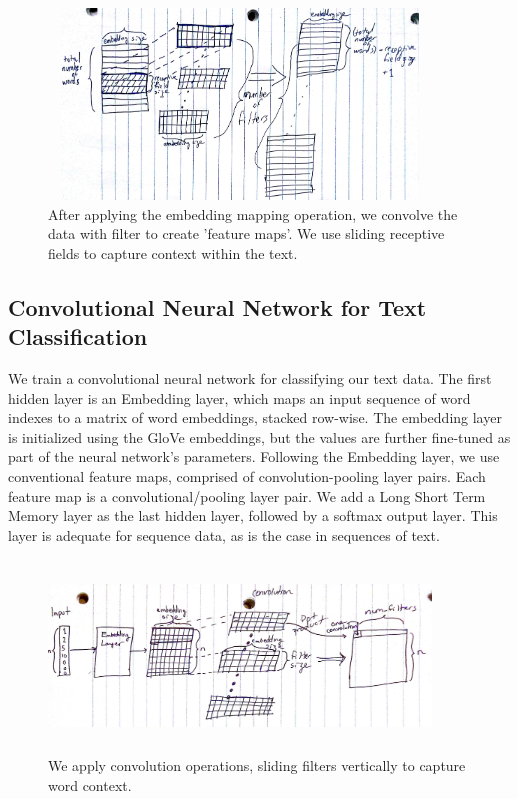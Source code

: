 \documentclass[12pt]{article}
\begin{document}
\begin{figure}[H]
\centering
\includegraphics[angle=90,origin=c,height=2in, width=4in]{Images/convolution_figure.jpg}
\caption{After applying the embedding mapping operation, we convolve the data with filter to create 'feature maps'. We use sliding receptive fields to
capture context within the text.}
\end{figure}

\subsection{Convolutional Neural Network for Text Classification}
We train a convolutional neural network for classifying our text data. The first hidden layer is an Embedding layer,
which maps an input sequence of word indexes to a matrix of word embeddings, stacked row-wise. The embedding layer is initialized
using the GloVe embeddings, but the values are further fine-tuned as part of the neural network's parameters.
Following the Embedding layer, we use conventional feature maps, comprised of convolution-pooling layer pairs.
Each feature map is a convolutional/pooling layer pair.
We add a Long Short Term Memory layer as the last hidden layer, followed by a softmax output layer.
This layer is adequate for sequence data, as is the case in sequences of text.

\begin{figure}[H]
\centering
\includegraphics[height=2in, width=4in]{Images/net_conv_figure.jpg}
\caption{We apply convolution operations, sliding filters vertically to capture word context.}
\end{figure}
\end{document}
